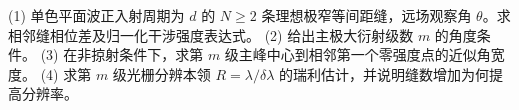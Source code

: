 (1) 单色平面波正入射周期为 \(d\) 的 \(N\ge2\) 条理想极窄等间距缝，远场观察角 \(\theta\)。求相邻缝相位差及归一化干涉强度表达式。
(2) 给出主极大衍射级数 \(m\) 的角度条件。
(3) 在非掠射条件下，求第 \(m\) 级主峰中心到相邻第一个零强度点的近似角宽度。
(4) 求第 \(m\) 级光栅分辨本领 \(R=\lambda/\delta\lambda\) 的瑞利估计，并说明缝数增加为何提高分辨率。
